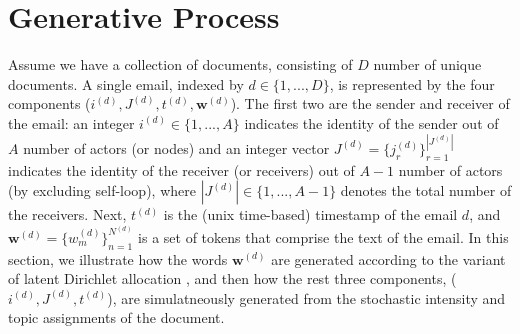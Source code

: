 \documentclass[a4paper]{article}
\begin{document}
\begin{comment}
Since Latent Dirichlet Allocation \citep{Blei2003}, which models of words alone, a variety of useful topic models have been developed by considering additional components other than words. One direction incorporated the network aspect by using the author and receiver information such as Author-Topic Models \citep{rosen2004author}, Author-Recipient-Topic Models and Role-Author-Recipient-Topic Models \citep{mccallum2005topic}, however, all of the models treat the author and recipients as observed variable thus generative processes only involve topics and words in a document. On the other side, there have been a lot of topic
models that focus on the timestamps of documents. For example, Dynamic Topic Models \citep{blei2006dynamic} introduced logistic normal topic models that rely on Markov assumptions with discretization of time, and Topics Over Time \citep{wang2006topics} suggested a countinuous-time model by generating a timestamp from the Beta distribution with its parameter depending on each topic assignment. However none of the above mentioned topic models are jointly dealing with the author-recipient and timestamps of the documents, although it is common in the field of dynamic network analysis to study who connects to whom and when $(i, j, t)$. 
\end{comment}

\section{Generative Process} \label{sec: Generative Process}
Assume we have a collection of documents, consisting of $D$ number of unique documents. A single email, indexed by $d \in \{1,...,D\}$, is represented by the four components ($i^{(d)}, J^{(d)}, t^{(d)},  \boldsymbol{w}^{(d)}$). The first two are the sender and receiver of the email: an integer $i^{(d)} \in \{1,...,A\}$ indicates the identity of the sender out of $A$ number of actors (or nodes) and an integer vector $J^{(d)} = \{j_r^{(d)}\}_{r=1}^{|J^{(d)}|} $ indicates the identity of the receiver (or receivers) out of $A-1$ number of actors (by excluding self-loop), where $|J^{(d)}|\in \{1,...,A-1\}$ denotes the total number of the receivers. Next, $t^{(d)}$ is the (unix time-based) timestamp of the email $d$, and $\boldsymbol{w}^{(d)} = \{w^{(d)}_m \}_{n=1}^{N^{(d)}}$ is a set of tokens that comprise the text of the email. In this section, we illustrate how the words $\boldsymbol{w}^{(d)}$ are generated according to the variant of latent Dirichlet allocation \citep{Blei2003}, and then how the rest three components, ($i^{(d)}, J^{(d)}, t^{(d)}$), are simulatneously generated from the stochastic intensity and topic assignments of the document.
\end{document}
